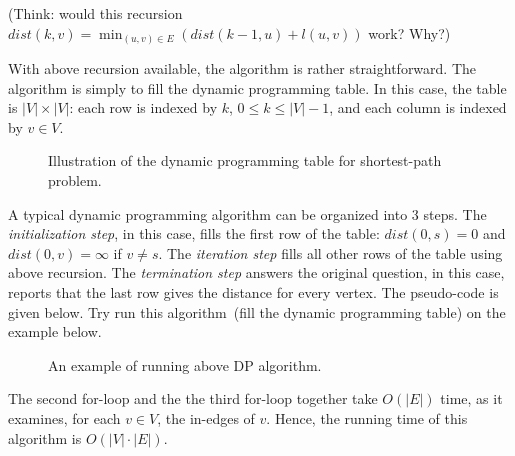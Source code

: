 (Think: would this recursion $dist(k,v) = \min_{(u,v)\in E} (dist(k-1,u) + l(u,v))$ work? Why?)

With above recursion available, the algorithm is rather straightforward.
The algorithm is simply to fill the dynamic programming table.
In this case, the table is $|V| \times |V|$: each row is indexed by $k$, $0 \le k \le |V| - 1$, 
and each column is indexed by $v\in V$. 

\begin{figure}[h]
\centering{}
\caption{Illustration of the dynamic programming table for shortest-path problem.}
\label{fig:table}
\end{figure}


A typical dynamic programming algorithm can be organized into 3 steps.
The \emph{initialization step}, in this case, fills the first row of the table:
$dist(0,s) = 0$ and $dist(0,v) = \infty$ if $v\neq s$.
The \emph{iteration step} fills all other rows of the table using above recursion.
The \emph{termination step} answers the original question, in this case,
reports that the last row gives the distance for every vertex.
The pseudo-code is given below.
Try run this algorithm~(fill the dynamic programming table) on the example below.

\begin{minipage}{0.8\textwidth}
	\xxx
	\xxx
	\xxx
	\xxx
	\xxx
	\xxx
	\xxx
	\xxx
	\xxx
	\xxx
	\xxx
	\xxx
	\xxx
	\xxx
	\xxx
\end{minipage}

\begin{figure}[h]
\centering{}
\caption{An example of running above DP algorithm.}
\label{fig:table}
\end{figure}


The second for-loop and the the third for-loop together take $O(|E|)$ time,
as it examines, for each $v\in V$, the in-edges of $v$.
Hence, the running time of this algorithm is $O(|V|\cdot |E|)$.

